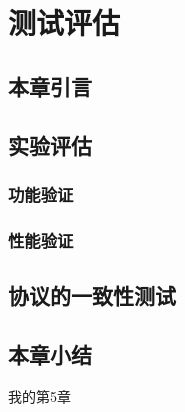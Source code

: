 \chapter{测试评估}
\label{cha:evaluate}


\section{本章引言}

\section{实验评估}

\subsection{功能验证}
\subsection{性能验证}

\section{协议的一致性测试}


\section{本章小结}

我的第5章
